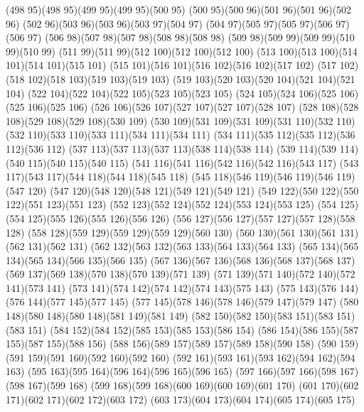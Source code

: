 \cpath (498 95)(498 95)(499 95)(499 95)(500 95)
\cpath (500 95)(500 96)(501 96)(501 96)(502 96)
\cpath (502 96)(503 96)(503 96)(503 97)(504 97)
\cpath (504 97)(505 97)(505 97)(506 97)(506 97)
\cpath (506 98)(507 98)(507 98)(508 98)(508 98)
\cpath (509 98)(509 99)(509 99)(510 99)(510 99)
\cpath (511 99)(511 99)(512 100)(512 100)(512 100)
\cpath (513 100)(513 100)(514 101)(514 101)(515 101)
\cpath (515 101)(516 101)(516 102)(516 102)(517 102)
\cpath (517 102)(518 102)(518 103)(519 103)(519 103)
\cpath (519 103)(520 103)(520 104)(521 104)(521 104)
\cpath (522 104)(522 104)(522 105)(523 105)(523 105)
\cpath (524 105)(524 106)(525 106)(525 106)(525 106)
\cpath (526 106)(526 107)(527 107)(527 107)(528 107)
\cpath (528 108)(528 108)(529 108)(529 108)(530 109)
\cpath (530 109)(531 109)(531 109)(531 110)(532 110)
\cpath (532 110)(533 110)(533 111)(534 111)(534 111)
\cpath (534 111)(535 112)(535 112)(536 112)(536 112)
\cpath (537 113)(537 113)(537 113)(538 114)(538 114)
\cpath (539 114)(539 114)(540 115)(540 115)(540 115)
\cpath (541 116)(541 116)(542 116)(542 116)(543 117)
\cpath (543 117)(543 117)(544 118)(544 118)(545 118)
\cpath (545 118)(546 119)(546 119)(546 119)(547 120)
\cpath (547 120)(548 120)(548 121)(549 121)(549 121)
\cpath (549 122)(550 122)(550 122)(551 123)(551 123)
\cpath (552 123)(552 124)(552 124)(553 124)(553 125)
\cpath (554 125)(554 125)(555 126)(555 126)(556 126)
\cpath (556 127)(556 127)(557 127)(557 128)(558 128)
\cpath (558 128)(559 129)(559 129)(559 129)(560 130)
\cpath (560 130)(561 130)(561 131)(562 131)(562 131)
\cpath (562 132)(563 132)(563 133)(564 133)(564 133)
\cpath (565 134)(565 134)(565 134)(566 135)(566 135)
\cpath (567 136)(567 136)(568 136)(568 137)(568 137)
\cpath (569 137)(569 138)(570 138)(570 139)(571 139)
\cpath (571 139)(571 140)(572 140)(572 141)(573 141)
\cpath (573 141)(574 142)(574 142)(574 143)(575 143)
\cpath (575 143)(576 144)(576 144)(577 145)(577 145)
\cpath (577 145)(578 146)(578 146)(579 147)(579 147)
\cpath (580 148)(580 148)(580 148)(581 149)(581 149)
\cpath (582 150)(582 150)(583 151)(583 151)(583 151)
\cpath (584 152)(584 152)(585 153)(585 153)(586 154)
\cpath (586 154)(586 155)(587 155)(587 155)(588 156)
\cpath (588 156)(589 157)(589 157)(589 158)(590 158)
\cpath (590 159)(591 159)(591 160)(592 160)(592 160)
\cpath (592 161)(593 161)(593 162)(594 162)(594 163)
\cpath (595 163)(595 164)(596 164)(596 165)(596 165)
\cpath (597 166)(597 166)(598 167)(598 167)(599 168)
\cpath (599 168)(599 168)(600 169)(600 169)(601 170)
\cpath (601 170)(602 171)(602 171)(602 172)(603 172)
\cpath (603 173)(604 173)(604 174)(605 174)(605 175)
